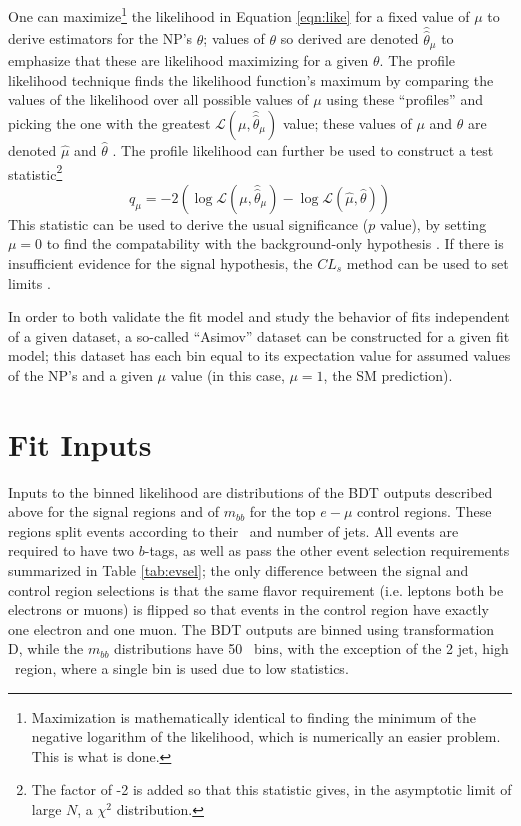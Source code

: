 One can maximize\footnote{Maximization is mathematically identical to finding the minimum of the negative logarithm of the likelihood, which is numerically an easier problem.  This is what is done.} the likelihood in Equation \ref{eqn:like} for a fixed value of $\mu$ to derive estimators for the NP's $\theta$; values of $\theta$ so derived are denoted $\hat{\hat{\theta}}_{\mu}$ to emphasize that these are likelihood maximizing for a given $\theta$.  The profile likelihood technique finds the likelihood function's maximum by comparing the values of the likelihood over all possible values of $\mu$ using these ``profiles'' and picking the one with the greatest $\mathcal{L}\left(\mu,\hat{\hat{\theta}}_{\mu}\right)$ value; these values of $\mu$ and $\theta$ are denoted $\hat{\mu}$ and $\hat{\theta}$ .  The profile likelihood can further be used to construct a test statistic\footnote{The factor of -2 is added so that this statistic gives, in the asymptotic limit of large $N$, a $\chi^2$ distribution.}
\begin{equation}
\label{eqn:teststat}
q_{\mu}=-2\left(\log\mathcal{L}\left(\mu,\hat{\hat{\theta}}_{\mu}\right)-\log\mathcal{L}\left(\hat{\mu},\hat{\theta}\right)\right)
\end{equation}
This statistic can be used to derive the usual significance ($p$ value), by setting $\mu=0$ to find the compatability with the background-only hypothesis \cite{asimov}.  If there is insufficient evidence for the signal hypothesis, the $CL_s$ method can be used to set limits \cite{cls_read}.

In order to both validate the fit model and study the behavior of fits independent of a given dataset, a so-called ``Asimov'' dataset can be constructed for a given fit model; this dataset has each bin equal to its expectation value for assumed values of the NP's and a given $\mu$ value (in this case, $\mu=1$, the SM prediction).

\section{Fit Inputs}
\label{ssec:inputs}
Inputs to the binned likelihood are distributions of the BDT outputs described above for the signal regions and of $m_{bb}$ for the top $e-\mu$ control regions.  These regions split events according to their \ptv\, and number of jets.  All events are required to have two $b$-tags, as well as pass the other event selection requirements summarized in Table \ref{tab:evsel}; the only difference between the signal and control region selections is that the same flavor requirement (i.e. leptons both be electrons or muons) is flipped so that events in the control region have exactly one electron and one muon.  The BDT outputs are binned using transformation D, while the $m_{bb}$ distributions have 50 \GeV\, bins, with the exception of the 2 jet, high \ptv\, region, where a single bin is used due to low statistics.

